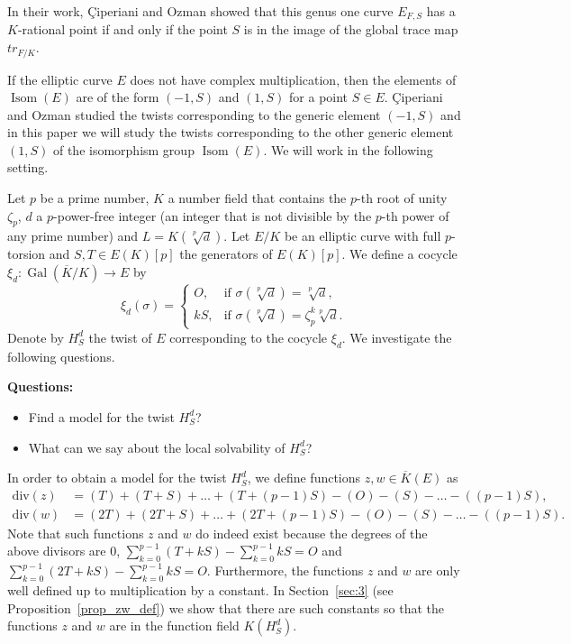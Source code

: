 \documentclass[a4paper, 12pt]{amsart}
\theoremstyle{definition}
\theoremstyle{remark}
\newcommand{\GalK}{\operatorname{Gal}(\overline{K}/K)}
\renewcommand{\div}{\mathrm{div}}
\numberwithin{equation}{section}
\begin{document}
In their work, Çiperiani and Ozman showed that this genus one curve $E_{F,S}$ has a $K$-rational point if and only if the point $S$ is in the image of the global trace map $tr_{F/K}$.

If the elliptic curve $E$ does not have complex multiplication, then the elements of $\operatorname{Isom}(E)$ are of the form $(-1,S)$ and $(1,S)$ for a point $S \in E$. Çiperiani and Ozman studied the twists corresponding to the generic element $(-1, S)$  and in this paper we will study the twists corresponding to the other generic element $(1, S)$ of the isomorphism group $\operatorname{Isom}(E)$. We will work in the following setting.

Let $p$ be a prime number, $K$ a number field that contains the $p$-th root of unity $\zeta_p$, $d$ a $p$-power-free integer (an integer that is not divisible by the $p$-th power of any prime number) and $L=K(\sqrt[p]{d})$.
Let $E/K$ be an elliptic curve with full $p$-torsion and $S,T \in E(K)[p]$ the generators of $E(K)[p]$. We define a cocycle $\xi_d : \GalK \to E$ by
\[
    \xi_d (\sigma)=
    \begin{cases}
        O, & \text{if } \sigma(\sqrt[p]{d})=\sqrt[p]{d}, \\
        kS, & \text{if } \sigma(\sqrt[p]{d})=\zeta_p^k\sqrt[p]{d}.
    \end{cases}
\]
Denote by $H_S^d$ the twist of $E$ corresponding to the cocycle $\xi_d$. We investigate the following questions.

\noindent \textbf{Questions:}
    \begin{itemize}
        \item Find a model for the twist $H_S^d$?

        \item  What can we say about the local solvability of $H_S^d$?
    \end{itemize}

In order to obtain a model for the twist $H_S^d$, we define functions $z,w \in \overline{K}(E)$ as
\begin{align*}
    \div{(z)} &= (T)+(T+S)+\dotso+(T+(p-1)S)-(O)-(S)-\dotso -((p-1)S),\\
    \div{(w)} &= (2T)+(2T+S)+\dotso+(2T+(p-1)S)-(O)-(S)-\dotso -((p-1)S).
\end{align*}
Note that such functions $z$ and $w$ do indeed exist because the degrees of the above divisors are $0$, $\displaystyle{\sum_{k=0}^{p-1}(T+kS) - \sum_{k=0}^{p-1}kS = O}$ and $\displaystyle{\sum_{k=0}^{p-1}(2T+kS) - \sum_{k=0}^{p-1}kS = O}$. Furthermore, the functions $z$ and $w$ are only well defined up to multiplication by a constant. In Section~\ref{sec:3} (see Proposition~\ref{prop_zw_def}) we show that there are such constants so that the functions $z$ and $w$ are in the function field $K(H_S^d)$.
\end{document}
